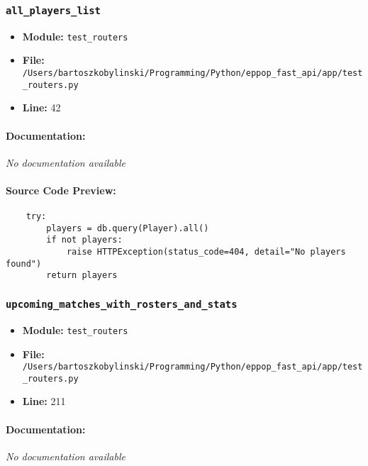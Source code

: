 \documentclass[11pt,a4paper]{article}
\begin{document}
\vspace{1em}
\subsubsection{\texttt{all\_players\_list}}

\begin{itemize}
    \item \textbf{Module:} \texttt{test\_routers}
    \item \textbf{File:} \texttt{/Users/bartoszkobylinski/Programming/Python/eppop\_fast\_api/app/test\_routers.py}
    \item \textbf{Line:} 42
\end{itemize}

\paragraph{Documentation:} \textit{No documentation available}

\paragraph{Source Code Preview:}
\begin{verbatim}
    try:
        players = db.query(Player).all()
        if not players:
            raise HTTPException(status_code=404, detail="No players found")
        return players
\end{verbatim}

\vspace{1em}
\subsubsection{\texttt{upcoming\_matches\_with\_rosters\_and\_stats}}

\begin{itemize}
    \item \textbf{Module:} \texttt{test\_routers}
    \item \textbf{File:} \texttt{/Users/bartoszkobylinski/Programming/Python/eppop\_fast\_api/app/test\_routers.py}
    \item \textbf{Line:} 211
\end{itemize}

\paragraph{Documentation:} \textit{No documentation available}
\end{document}
